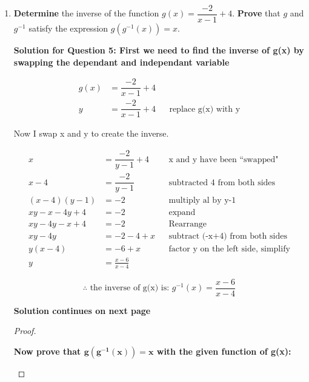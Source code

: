 \documentclass[12pt]{book}
\begin{document}
\begin{enumerate}
\newpage

\item \textbf{Determine} the inverse of the function $g(x)=\dfrac{-2}{x-1}+4$. \textbf{Prove} that $g$ and $g^{-1}$ satisfy the expression $g(g^{-1}(x))=x$.

\vspace{1em}
\textbf{Solution for Question 5: First we need to find the inverse of g(x) by swapping the dependant and independant variable}

\begin{align*}
    g(x) &=\dfrac{-2}{x-1}+4 \\
    y &=\dfrac{-2}{x-1}+4 && \text{replace g(x) with y}
\end{align*}

\vspace{0.5em}
\begin{center}
    Now I swap x and y to create the inverse.
\end{center}
\vspace{-1em}

\begin{align*}
    x &=\dfrac{-2}{y-1}+4 && \text{x and y have been ``swapped"} \\
    x-4 &=\dfrac{-2}{y-1} && \text{subtracted 4 from both sides} \\
    (x-4)(y-1) &= -2 && \text{multiply al by y-1} \\
    xy-x-4y+4 &= -2 && \text{expand} \\
    xy-4y-x+4 &= -2 && \text{Rearrange}\\
    xy-4y &= -2-4+x && \text{subtract (-x+4) from both sides} \\
    y(x-4) &= -6+x && \text{factor y on the left side, simplify} \\
    y &= \frac{x-6}{x-4}
\end{align*}

$$\therefore \text{ the inverse of g(x) is: } \boxed{g^{-1}(x) = \frac{x-6}{x-4}} $$

\vspace{3em}
\begin{center}
    \textbf{Solution continues on next page}
\end{center}

\newpage
\begin{proof}
    \begin{center}
        \textbf{Now prove that $\boldsymbol{g(g^{-1}(x)) = x}$ with the given function of g(x):}
    \end{center}


\end{proof}
\end{enumerate}
\end{document}
